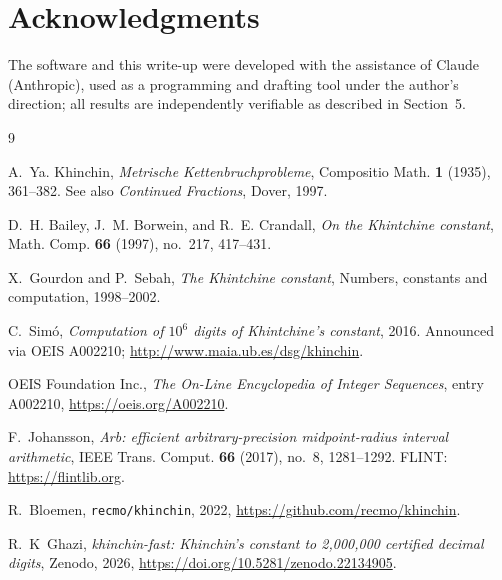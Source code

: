 \documentclass[11pt]{amsart}
\begin{document}
\section*{Acknowledgments}

The software and this write-up were developed with the assistance of
Claude (Anthropic), used as a programming and drafting tool under the
author's direction; all results are independently verifiable as
described in Section~5.

\begin{thebibliography}{9}

A.~Ya. Khinchin,
\emph{Metrische Kettenbruchprobleme},
Compositio Math. \textbf{1} (1935), 361--382.
See also \emph{Continued Fractions}, Dover, 1997.

D.~H. Bailey, J.~M. Borwein, and R.~E. Crandall,
\emph{On the Khintchine constant},
Math. Comp. \textbf{66} (1997), no.~217, 417--431.

X.~Gourdon and P.~Sebah,
\emph{The Khintchine constant},
Numbers, constants and computation, 1998--2002.

C.~Sim\'o,
\emph{Computation of $10^6$ digits of Khintchine's constant}, 2016.
Announced via OEIS A002210;
\url{http://www.maia.ub.es/dsg/khinchin}.

OEIS Foundation Inc.,
\emph{The On-Line Encyclopedia of Integer Sequences}, entry A002210,
\url{https://oeis.org/A002210}.

F.~Johansson,
\emph{Arb: efficient arbitrary-precision midpoint-radius interval
arithmetic},
IEEE Trans. Comput. \textbf{66} (2017), no.~8, 1281--1292.
FLINT: \url{https://flintlib.org}.

R.~Bloemen,
\texttt{recmo/khinchin}, 2022,
\url{https://github.com/recmo/khinchin}.

R.~K~Ghazi,
\emph{khinchin-fast: Khinchin's constant to 2{,}000{,}000 certified
decimal digits}, Zenodo, 2026,
\url{https://doi.org/10.5281/zenodo.22134905}.

\end{thebibliography}
\end{document}
